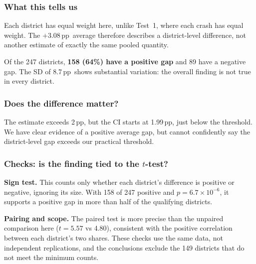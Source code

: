 \documentclass[10pt,a4paper,twocolumn]{article}
\newcommand{\pp}{\,pp}
\begin{document}
\begin{minipage}{\linewidth}
\captionsetup{type=figure}
\centering
{}
\caption{Test 2: KSI-share differences across 247 districts. The orange line marks the mean,
$+3.08$\pp; the spread shows that the gap varies across districts.}
\label{fig:dist}
\end{minipage}

\subsubsection*{What this tells us}
Each district has equal weight here, unlike Test~1, where each crash has equal weight.
The $+3.08$\pp\ average therefore describes a district-level difference, not another estimate
of exactly the same pooled quantity.

Of the 247 districts, \textbf{158 (64\%) have a positive gap} and 89 have a negative gap.
The SD of 8.7\pp\ shows substantial variation: the overall finding is not true in every district.

\subsubsection*{Does the difference matter?}
The estimate exceeds 2\pp, but the CI starts at 1.99\pp, just below the threshold.
We have clear evidence of a positive average gap, but cannot confidently say the district-level
gap exceeds our practical threshold.

\subsubsection*{Checks: is the finding tied to the $t$-test?}
\textbf{Sign test.} This counts only whether each district's difference is positive or negative,
ignoring its size. With 158 of 247 positive and $p=6.7\times10^{-6}$, it supports a positive gap
in more than half of the qualifying districts.

\textbf{Pairing and scope.} The paired test is more precise than the unpaired comparison here
($t=5.57$ vs 4.80), consistent with the positive correlation between each district's two shares.
These checks use the same data, not independent replications, and the conclusions exclude
the 149 districts that do not meet the minimum counts.
\end{document}
